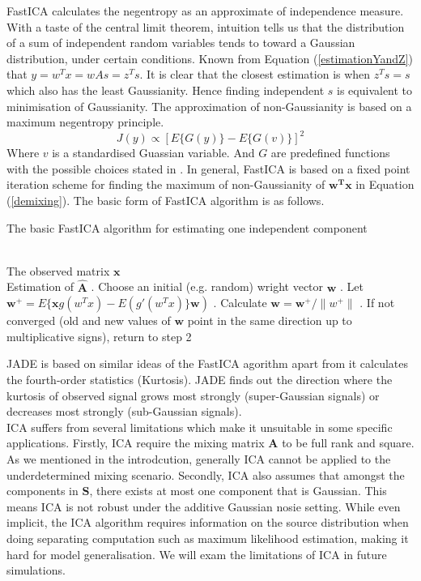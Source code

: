 FastICA calculates the negentropy as an approximate of independence measure. With a taste of the central limit theorem, intuition tells us that the distribution of a sum of independent random variables tends to toward a Gaussian distribution, under certain conditions. Known from Equation (\ref{estimationYandZ}) that $y = w^T x = w A s = z^T s$. It is clear that the closest estimation is when $z^Ts = s$ which also has the least Gaussianity. Hence finding independent $s$ is equivalent to minimisation of Gaussianity. The approximation of non-Gaussianity is based on a maximum negentropy principle.
\begin{equation}
    J(y) \propto [E\{G(y)\} - E\{G(v)\}]^2
\end{equation}
Where $v$ is a standardised Guassian variable. And $G$ are predefined functions with the possible choices stated in \cite{HYVARINEN2000411}. In general, FastICA is based on a fixed point iteration scheme for finding the maximum of non-Gaussianity of $\mathbf{w^T x}$ in Equation (\ref{demixing}). The basic form of FastICA algorithm is as follows.

\begin{algorithm}[!htbp] 
\caption{ The basic FastICA algorithm for estimating one independent component}
\label{alg:Framwork} 
\begin{algorithmic}
\REQUIRE ~~\\%
The observed matrix $\mathbf{x}$
\ENSURE ~~\\ %
Estimation of $\hat{\mathbf{A}}$
. Choose an initial (e.g. random) wright vector $\mathbf{w}$
. Let $\mathbf{w}^+ = E\{\mathbf{x}g(w^T x) - E(g'(w^Tx)\}\mathbf{w})$
. Calculate $\mathbf{w} = \mathbf{w}^{+}/\lVert w^{+}\rVert$
. If not converged (old and new values of $\mathbf{w}$ point in the same direction up to multiplicative signs), return to step 2
\end{algorithmic}
\end{algorithm}

JADE is based on similar ideas of the FastICA agorithm apart from it calculates the fourth-order statistics (Kurtosis). JADE finds out the direction where the kurtosis of observed signal grows most strongly (super-Gaussian signals) or decreases most strongly (sub-Gaussian signals).\\

\label{ica_defect}
ICA suffers from several limitations which make it unsuitable in some specific applications. Firstly, ICA require the mixing matrix $\mathbf{A}$ to be full rank and square. As we mentioned in the introdcution, generally ICA cannot be applied to the underdetermined mixing scenario. Secondly, ICA also assumes that amongst the components in $\mathbf{S}$, there exists at most one component that is Gaussian. This means ICA is not robust under the additive Gaussian nosie setting. While even implicit, the ICA algorithm requires information on the source distribution when doing separating computation such as maximum likelihood estimation, making it hard for model generalisation. We will exam the limitations of ICA in future simulations.


